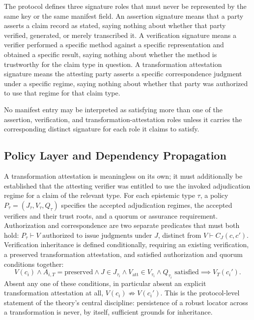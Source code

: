 The protocol defines three signature roles that must never be represented by the same key or the same manifest field. An assertion signature means that a party asserts a claim record as stated, saying nothing about whether that party verified, generated, or merely transcribed it. A verification signature means a verifier performed a specific method against a specific representation and obtained a specific result, saying nothing about whether the method is trustworthy for the claim type in question. A transformation attestation signature means the attesting party asserts a specific correspondence judgment under a specific regime, saying nothing about whether that party was authorized to use that regime for that claim type.

\begin{proposition}
No manifest entry may be interpreted as satisfying more than one of the assertion, verification, and transformation-attestation roles unless it carries the corresponding distinct signature for each role it claims to satisfy.
\end{proposition}

\subsection{Policy Layer and Dependency Propagation}

A transformation attestation is meaningless on its own; it must additionally be established that the attesting verifier was entitled to use the invoked adjudication regime for a claim of the relevant type. For each epistemic type $\tau$, a policy $P_\tau = (J_\tau, V_\tau, Q_\tau)$ specifies the accepted adjudication regimes, the accepted verifiers and their trust roots, and a quorum or assurance requirement. Authorization and correspondence are two separate predicates that must both hold: $P_\tau \vdash V \text{ authorized to issue judgments under } J$, distinct from $V \vdash C_J(c,c')$. Verification inheritance is defined conditionally, requiring an existing verification, a preserved transformation attestation, and satisfied authorization and quorum conditions together:
\[
V(c_i) \land A_{i,T} = \mathrm{preserved} \land J \in J_{\tau_i} \land V_{\mathrm{att}} \in V_{\tau_i} \land Q_{\tau_i} \text{ satisfied} \implies V_T(c_i').
\]
Absent any one of these conditions, in particular absent an explicit transformation attestation at all, $V(c_i) \not\Rightarrow V(c_i')$. This is the protocol-level statement of the theory's central discipline: persistence of a robust locator across a transformation is never, by itself, sufficient grounds for inheritance.

